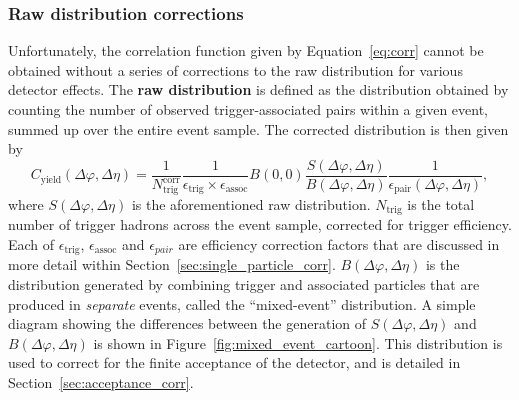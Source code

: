 \subsubsection{Raw distribution corrections}
\label{sec:raw_corr}
Unfortunately, the correlation function given by Equation~\ref{eq:corr} cannot be obtained without a series of corrections to the raw distribution for various detector effects. The \textbf{raw distribution} is defined as the distribution obtained by counting the number of observed trigger-associated pairs within a given event, summed up over the entire event sample. The corrected distribution is then given by
%
\begin{equation}
    C_{\text{yield}}(\Delta\varphi, \Delta\eta) = \frac{1}{N_{\text{trig}}^{\text{corr}}}\frac{1}{\epsilon_{\text{trig}}\times\epsilon_{\text{assoc}}}B(0,0)\frac{S(\Delta\varphi, \Delta\eta)}{B(\Delta\varphi, \Delta\eta)}\frac{1}{\epsilon_{\text{pair}}(\Delta\varphi, \Delta\eta)},
\label{eq:corr_detector}
\end{equation}
%
where $S(\Delta\varphi, \Delta\eta)$ is the aforementioned raw distribution. $N_{\text{trig}}$ is the total number of trigger hadrons across the event sample, corrected for trigger efficiency. Each of $\epsilon_{\text{trig}}$, $\epsilon_{\text{assoc}}$ and $\epsilon_{pair}$ are efficiency correction factors that are discussed in more detail within Section~\ref{sec:single_particle_corr}.  $B(\Delta\varphi, \Delta\eta)$ is the distribution generated by combining trigger and associated particles that are produced in \textit{separate} events, called the ``mixed-event'' distribution. A simple diagram showing the differences between the generation of $S(\Delta\varphi, \Delta\eta)$ and $B(\Delta\varphi, \Delta\eta)$ is shown in Figure~\ref{fig:mixed_event_cartoon}. This distribution is used to correct for the finite acceptance of the detector, and is detailed in Section~\ref{sec:acceptance_corr}.

